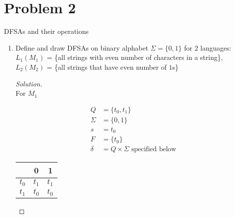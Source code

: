 \documentclass[11pt]{article}
\theoremstyle{plain}%
\theoremstyle{definition}
\theoremstyle{remark}
\newenvironment{solution}
  {\begin{proof}[Solution]}
  {\end{proof}}
\begin{document}
\section*{Problem 2}
DFSAs and their operations
\begin{enumerate}
\item Define and draw DFSAs on binary alphabet $\Sigma=\{0,1\}$ for 2 languages: $L_1(M_1)$ = \{all strings with even number of characters in a string\}, $L_2(M_2)$ = \{all strings that have even number of $1$s\}

\begin{solution}
  $ $\\
  For $M_1$
  \begin{center}
  \end{center}
  \begin{align*}
    Q &= \{t_0, t_1\}\\
    \Sigma &= \{0, 1\}\\
    s &= t_0 \\
    F &= \{t_0\} \\
    \delta &= Q \times \Sigma\text{ specified below}
  \end{align*}
  \begin{center}
    \begin{tabular}{|c | c c|}
    \hline
     & 0 & 1 \\
    \hline
    $t_0$ & $t_1$ & $t_1$ \\
    \hline
    $t_1$ & $t_0$ & $t_0$ \\
    \hline
   \end{tabular}
  \end{center}


\end{solution}
\end{enumerate}
\end{document}

